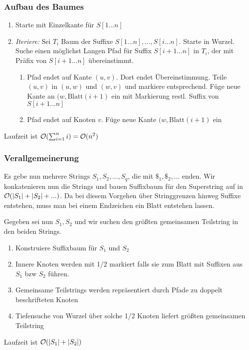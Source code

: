         \subsubsection{Aufbau des Baumes}
            \begin{enumerate}
                \item Starte mit Einzelkante für $S[1...n]$
                \item \emph{Iteriere:} Sei $T_i$ Baum der Suffixe $S[1...n],...,S[i...n]$. Starte in Wurzel. Suche einen möglichst Langen Pfad für Suffix $S[i+1...n]$ in $T_i$, der mit Präfix von $S[i+1...n]$ übereinstimmt. 
                \begin{enumerate}
                    \item Pfad endet auf Kante $(u,v)$. Dort endet Übereinstimmung. Teile $(u,v)$ in $(u,w)$ und $(w,v)$ und markiere entsprechend. Füge neue Kante an $(w, \text{Blatt}(i+1)$ ein mit Markierung restl. Suffix von $S[i+1...n]$
                    \item Pfad endet auf Knoten $v$. Füge neue Kante $(w, \text{Blatt}(i+1)$ ein
                \end{enumerate}
            \end{enumerate}
            Laufzeit ist $\mathcal{O}(\sum_{i=1}^{n}{i}) = \mathcal{O}(n^2)$
            
            
        \subsubsection{Verallgemeinerung}
            Es gebe nun mehrere Strings $S_1,S_2,...,S_q$, die mit $\$_1,\$_2,...$ enden. Wir konkatenieren nun die Strings und bauen Suffixbaum für den Superstring auf in $\mathcal{O}(\lvert S_1\rvert + \lvert S_2\rvert +...)$. Da bei diesem Vorgehen über Stringgrenzen hinweg Suffixe entstehen, muss man bei einem Endzeichen ein Blatt entstehen lassen.
            
            
            Gegeben sei nun $S_1,S_2$ und wir suchen den größten gemeinsamen Teilstring in den beiden Strings.
            \begin{enumerate}
                \item Konstruiere Suffixbaum für $S_1$ und $S_2$
                \item Innere Knoten werden mit 1/2 markiert falls sie zum Blatt mit Suffixen aus $S_1$ bzw $S_2$ führen.
                \item Gemeinsame Teilstrings werden repräsentiert durch Pfade zu doppelt beschrifteten Knoten
                \item Tiefensuche von Wurzel über solche 1/2 Knoten liefert größten gemeinsamen Teilstring
            \end{enumerate}
            Laufzeit ist $\mathcal{O}(\lvert S_1\rvert+\lvert S_2\rvert)$
            
